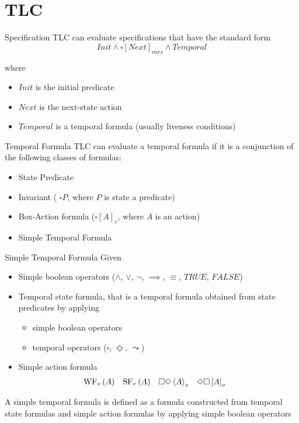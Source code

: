 
\section[image=bgphoto_cut]{TLC}
\begin{frame}[plain]{}
    \sectionpage
\end{frame}

\begin{frame}{Specification}
    TLC can evaluate specifications that have the standard form
    \[
        Init \land \square \left[ Next \right]_{vars} \land Temporal
    \]

    where
    \begin{itemize}
        \item $Init$ is the initial predicate
        \item $Next$ is the next-state action
        \item $Temporal$ is a temporal formula (usually liveness conditions)
    \end{itemize}

\end{frame}

\begin{frame}{Temporal Formula}
    TLC can evaluate a temporal formula if it is a conjunction of the following classes of formulas:
    \begin{itemize}
        \item State Predicate
        \item Invariant ( $\square P$, where $P$ is state a predicate)
        \item Box-Action formula ($\square[A]_v$, where $A$ is an action)
        \item Simple Temporal Formula
    \end{itemize}
\end{frame}

\begin{frame}{Simple Temporal Formula}
    Given
    \begin{itemize}
        \item Simple boolean operators ($\land$, $\lor$, $\neg$, $\implies$, $\equiv$, $TRUE$, $FALSE$)
        \item Temporal state formula, that is a temporal formula obtained from state predicates by applying
        \begin{itemize}
            \item simple boolean operators
            \item temporal operators ($\square$, $\Diamond$, $\leadsto$)
        \end{itemize}
        \item Simple action formula\begin{align*}
            \textrm{WF}_v \left( A \right) &&
            \textrm{SF}_v \left( A \right) &&
            \square \Diamond \left< A \right>_v &&
            \Diamond \square \left[ A \right]_v &&
        \end{align*}
    \end{itemize}
    A simple temporal formula is defined as a formula constructed from temporal state formulas and simple action formulas by applying simple boolean operators
\end{frame}

